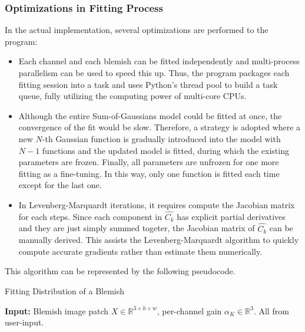 \begin{spacing}{1.5}
\subsubsection{Optimizations in Fitting Process}
In the actual implementation, several optimizations are performed to the program:
\begin{itemize}
    \item Each channel and each blemish can be fitted independently and multi-process parallelism can be used to speed this up. Thus, the program packages each fitting session into a task and uses Python's thread pool to build a task queue, fully utilizing the computing power of multi-core CPUs.  
    \item Although the entire Sum-of-Gaussians model could be fitted at once, the convergence of the fit would be slow. Therefore, a strategy is adopted where a new $N$-th Gaussian function is gradually introduced into the model with $N-1$ functions and the updated model is fitted, during which the existing parameters are frozen. Finally, all parameters are unfrozen for one more fitting as a fine-tuning. In this way, only one function is fitted each time except for the last one.
    \item In Levenberg-Marquardt iterations, it requires compute the Jacobian matrix for each steps. Since each component in $\hat{C_k}$ has explicit partial derivatives and they are just simply summed togeter, the Jacobian matrix of $\hat{C_k}$ can be manually derived. This assists the Levenberg-Marquardt algorithm to quickly compute accurate gradients rather than estimate them numerically.
\end{itemize}
This algorithm can be represented by the following pseudocode.
\begin{algorithm}
    \caption{Fitting Distribution of a Blemish}
    \begin{algorithmic}[1]
    
    \State \textbf{Input:} Blemish image patch $X\in\mathbb{R}^{3\times h \times w}$, per-channel gain $\alpha_K\in\mathbb{R}^3$. All from user-input.
    

\end{algorithmic}
\end{algorithm}
\end{spacing}
